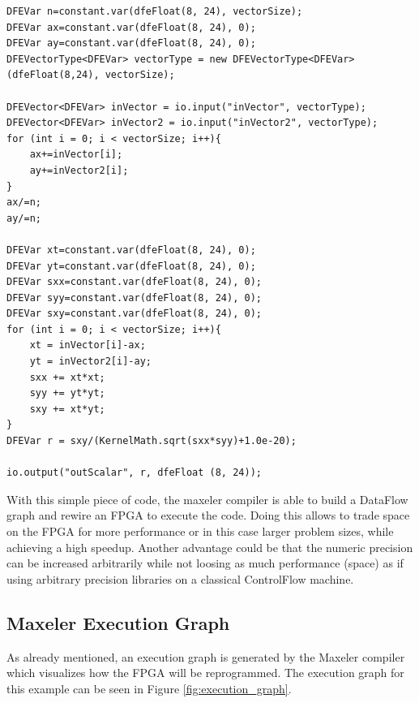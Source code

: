 \documentclass{llncs}
\begin{document}
\begin{lstlisting}[style=JavaStyle,label={lst:JavaImplementation},caption={Implementation in Maxeler Java},captionpos=b]
DFEVar n=constant.var(dfeFloat(8, 24), vectorSize);
DFEVar ax=constant.var(dfeFloat(8, 24), 0);
DFEVar ay=constant.var(dfeFloat(8, 24), 0);
DFEVectorType<DFEVar> vectorType = new DFEVectorType<DFEVar>(dfeFloat(8,24), vectorSize);

DFEVector<DFEVar> inVector = io.input("inVector", vectorType);
DFEVector<DFEVar> inVector2 = io.input("inVector2", vectorType);
for (int i = 0; i < vectorSize; i++){
	ax+=inVector[i];
	ay+=inVector2[i];
}
ax/=n;
ay/=n;

DFEVar xt=constant.var(dfeFloat(8, 24), 0);
DFEVar yt=constant.var(dfeFloat(8, 24), 0);
DFEVar sxx=constant.var(dfeFloat(8, 24), 0);
DFEVar syy=constant.var(dfeFloat(8, 24), 0);
DFEVar sxy=constant.var(dfeFloat(8, 24), 0);
for (int i = 0; i < vectorSize; i++){
	xt = inVector[i]-ax;
	yt = inVector2[i]-ay;
	sxx += xt*xt;
	syy += yt*yt;
	sxy += xt*yt;
}
DFEVar r = sxy/(KernelMath.sqrt(sxx*syy)+1.0e-20);

io.output("outScalar", r, dfeFloat (8, 24));
\end{lstlisting}

With this simple piece of code, the maxeler compiler is able to build a DataFlow graph and rewire an FPGA to execute the code. Doing this allows to trade space on the FPGA for more performance or in this case larger problem sizes, while achieving a high speedup. Another advantage could be that the numeric precision can be increased arbitrarily while not loosing as much performance (space) as if using arbitrary precision libraries on a classical ControlFlow machine. 

\subsection{Maxeler Execution Graph}\label{sec:Maxeler_Execution_Graph}

As already mentioned, an execution graph is generated by the Maxeler compiler which visualizes how the FPGA will be reprogrammed. The execution graph for this example can be seen in Figure \ref{fig:execution_graph}.
\end{document}
